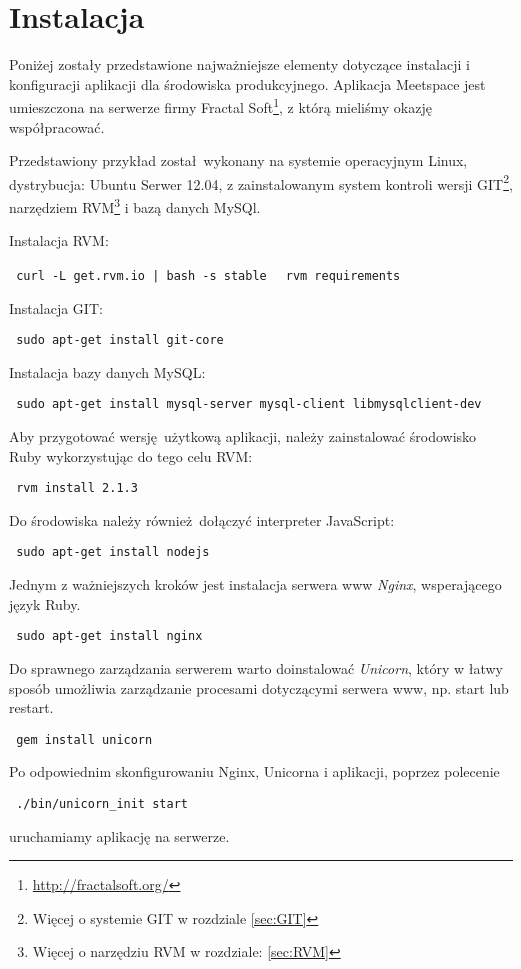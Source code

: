 \section{Instalacja}
Poniżej zostały przedstawione najważniejsze elementy dotyczące instalacji i konfiguracji aplikacji dla środowiska produkcyjnego. Aplikacja Meetspace jest umieszczona na serwerze firmy Fractal Soft\footnote{\url{http://fractalsoft.org/}}, z którą mieliśmy okazję współpracować.

Przedstawiony przykład został wykonany na systemie operacyjnym Linux, dystrybucja: Ubuntu Serwer 12.04, z zainstalowanym system kontroli wersji GIT\footnote{Więcej o systemie GIT w rozdziale \ref{sec:GIT}}, narzędziem RVM\footnote{Więcej o narzędziu RVM w rozdziale: \ref{sec:RVM}} i bazą danych MySQl.

Instalacja RVM:
\begin{center}
  \texttt{ curl -L get.rvm.io | bash -s stable }
  \texttt{ rvm requirements }
\end{center}

Instalacja GIT:
\begin{center}
  \texttt{ sudo apt-get install git-core }
\end{center}

Instalacja bazy danych MySQL:
\begin{center}
  \texttt{ sudo apt-get install mysql-server mysql-client libmysqlclient-dev }
\end{center}

Aby przygotować wersję użytkową aplikacji, należy zainstalować środowisko Ruby wykorzystując do tego celu RVM:
\begin{center}
  \texttt{ rvm install 2.1.3 }
\end{center}
Do środowiska należy również dołączyć interpreter JavaScript:
\begin{center}
  \texttt{ sudo apt-get install nodejs }
\end{center}

\clearpage
Jednym z ważniejszych kroków jest instalacja serwera www \emph{Nginx}, wsperającego język Ruby.
\begin{center}
  \texttt{ sudo apt-get install nginx }
\end{center}

Do sprawnego zarządzania serwerem warto doinstalować \emph{Unicorn}, który w łatwy sposób umożliwia zarządzanie procesami dotyczącymi serwera www, np. start lub restart.
\begin{center}
  \texttt{ gem install unicorn }
\end{center}

Po odpowiednim skonfigurowaniu Nginx, Unicorna i aplikacji, poprzez polecenie
\begin{center}
  \texttt{ ./bin/unicorn\_init start }
\end{center}

uruchamiamy aplikację na serwerze.
